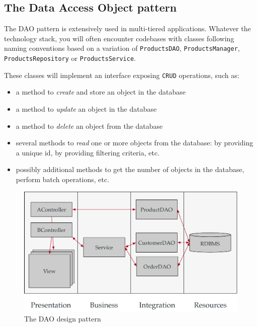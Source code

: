 \subsection{The Data Access Object pattern}

The \ac{DAO} pattern is extensively used in multi-tiered applications. Whatever the technology stack, you will often encounter codebases with classes following naming conventions based on a variation of \texttt{ProductsDAO}, \texttt{ProductsManager}, \texttt{ProductsRepository} or \texttt{ProductsService}. 

These classes will implement an interface exposing \texttt{CRUD} operations, such as:

\begin{itemize}
\item a method to \emph{create} and store an object in the database
\item a method to \emph{update} an object in the database
\item a method to \emph{delete} an object from the database
\item several methods to \emph{read} one or more objects from the database: by providing a unique id, by providing filtering criteria, etc.
\item possibly additional methods to get the number of objects in the database, perform batch operations, etc.
\end{itemize}

\begin{figure}[]
	\centering
    \includegraphics[width=1.0\linewidth]{Figures/dao-in-tiers.pdf}
	\caption{The DAO design pattern}
  \label{fig:daoInTiers}
\end{figure}

